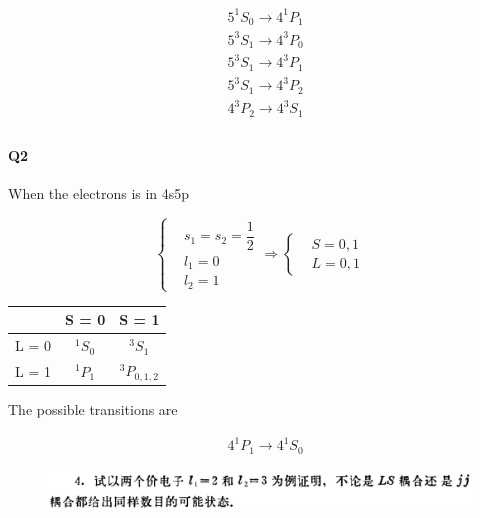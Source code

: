 \documentclass{article}
\begin{document}
\begin{equation*}
  \begin{aligned}
    & 5^1 S_0 \rightarrow 4^1 P_1 \\
    & 5^3 S_1 \rightarrow 4^3 P_0 \\
    & 5^3 S_1 \rightarrow 4^3 P_1 \\
    & 5^3 S_1 \rightarrow 4^3 P_2 \\
    & 4^3 P_2 \rightarrow 4^3 S_1 \\
  \end{aligned}
\end{equation*}

\paragraph{Q2}

When the electrons is in 4s5p

\begin{equation*}
  \left\{
    \begin{aligned}
      & s_1 = s_2 = \dfrac{1}{2} \\
      & l_1 = 0 \\
      & l_2 = 1
    \end{aligned}
  \right.
  \Rightarrow
 \left\{
    \begin{aligned}
      & S = 0,1 \\
      & L = 0,1
    \end{aligned}
  \right.
\end{equation*}

\begin{center}
\begin{tabular}{ c|cc } 
        & S = 0 & S = 1 \\
  \hline
  L = 0 & ${}^{1}S_{0}$ & ${}^{3}S_{1}$ \\
  L = 1 & ${}^{1}P_{1}$ & ${}^{3}P_{0,1,2}$ 
\end{tabular}
\end{center}

The possible transitions are

\begin{equation*}
  \begin{aligned}
    & 4^1 P_1 \rightarrow 4^1 S_0
  \end{aligned}
\end{equation*}

\begin{figure}[H]
  \centering
  \includegraphics[width=\linewidth]{figures/Problem4}
  \label{fig:}
\end{figure}
\end{document}
